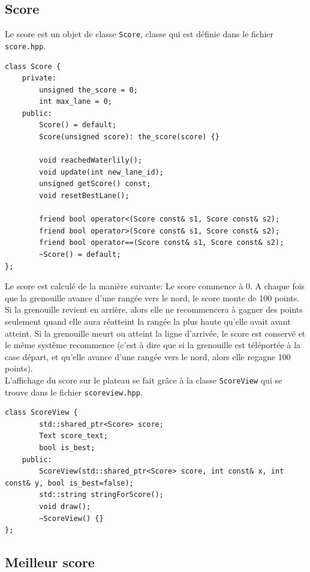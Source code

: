 \documentclass[a4paper, 12pt]{article}
\begin{document}
\subsection{Score}

Le score est un objet de classe \texttt{Score}, 
classe qui est définie dans le fichier \texttt{score.hpp}.
\begin{lstlisting}
class Score {
    private:
        unsigned the_score = 0;
        int max_lane = 0;
    public:
        Score() = default;
        Score(unsigned score): the_score(score) {}

        void reachedWaterlily();
        void update(int new_lane_id);
        unsigned getScore() const;
        void resetBestLane();

        friend bool operator<(Score const& s1, Score const& s2);
        friend bool operator>(Score const& s1, Score const& s2);
        friend bool operator==(Score const& s1, Score const& s2);
        ~Score() = default;
};
\end{lstlisting}

Le score est calculé de la manière suivante: 
Le score commence à 0. 
A chaque fois que la grenouille avance d'une rangée vers le nord, le score monte de 100 points.
Si la grenouille revient en arrière, 
alors elle ne recommencera à gagner des points seulement quand elle aura réatteint la rangée 
la plus haute qu'elle avait avant atteint.
Si la grenouille meurt ou atteint la ligne d'arrivée, le score est conservé et le même système
recommence (c'est à dire que si la grenouille est téléportée à la case départ, et qu'elle
avance d'une rangée vers le nord, alors elle regagne 100 points). \\

L'affichage du score sur le plateau se fait grâce à la classe \texttt{ScoreView}
qui se trouve dans le fichier \texttt{scoreview.hpp}.

\begin{lstlisting}
class ScoreView {
        std::shared_ptr<Score> score;
        Text score_text;
        bool is_best;
    public:
        ScoreView(std::shared_ptr<Score> score, int const& x, int const& y, bool is_best=false);
        std::string stringForScore();
        void draw();
        ~ScoreView() {}
};
\end{lstlisting}

\subsection{Meilleur score}
\end{document}
